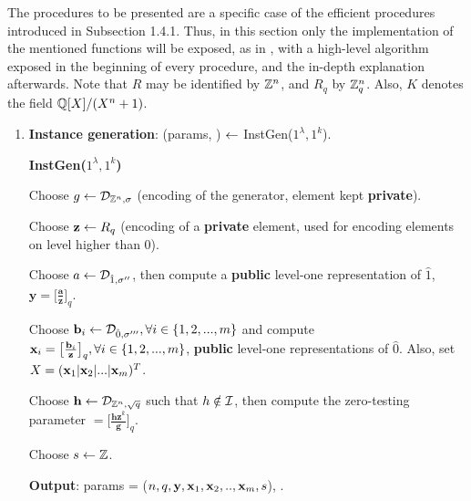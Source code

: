 The procedures to be presented are a specific case of the efficient procedures introduced in Subsection 1.4.1. Thus, in this section only the implementation of the mentioned functions will be exposed, as in \cite{GGH13}, with a high-level algorithm exposed in the beginning of every procedure, and the in-depth explanation afterwards. Note that $R$ may be identified by ${\mathbb Z}^n$, and $R_q$ by ${\mathbb Z}_q^n$. Also, $K$ denotes the field $\mathbb{Q}[X]/(X^{n}+1)$.\\

\begin{enumerate}[label=(\alph*)]
	\item \textbf{Instance generation}: (params, \pzt) $\leftarrow$ InstGen($1^\lambda, 1^k$).
	
	\begin{tcolorbox}[colframe=black,colback=white,arc=0pt,outer arc=0pt]
		\begin{center}
			\textbf{InstGen($1^\lambda, 1^k$)}
		\end{center}
		\begin{algorithmic}[1]
			\State Choose $g \leftarrow \mathcal{D}_{{\mathbb Z}^n, \sigma}$ (encoding of the generator, element kept \textbf{private}).
			\Statex
			
			\State Choose $\textbf{z}\leftarrow R_q$ (encoding of a \textbf{private} element, used for encoding elements on level higher than 0).
			\Statex
			
			\State Choose $a \leftarrow \mathcal{D}_{\hat{1}, \sigma''}$, then compute a \textbf{public} level-one representation of $\hat{1}$, $\textbf{y} = \big[\frac{\textbf{a}}{\textbf{z}}\big]_q$.
			\Statex
			
			\State Choose $\textbf{b}_i \leftarrow \mathcal{D}_{\hat{0}, \sigma'''}, \forall i \in \{1,2,..., m\}$ and compute $\textbf{x}_i = \big[\frac{\textbf{b}_i}{\textbf{z}}\big]_q, \forall i \in \{1,2,..., m\}$, \textbf{public} level-one representations of $\hat{0}$. Also, set  $X = (\textbf{x}_1 | \textbf{x}_2 |...|\textbf{x}_m)^T$.
			\Statex
			
			\State Choose $\textbf{h} \leftarrow \mathcal{D}_{{\mathbb Z}^n, \sqrt{q}}$ such that $h \notin \mathcal{I}$, then compute the zero-testing parameter \pzt$=\big[\frac{\textbf{hz}^k}{\textbf{g}}\big]_q$.
			\Statex
			
			\State Choose $s \leftarrow {\mathbb Z}$.
			\Statex
			
			\State \textbf{Output}: params = ($n, q, \textbf{y}, \textbf{x}_1,\textbf{x}_2,..,\textbf{x}_m, s$), \pzt.
		\end{algorithmic}
	\end{tcolorbox}


\end{enumerate}
